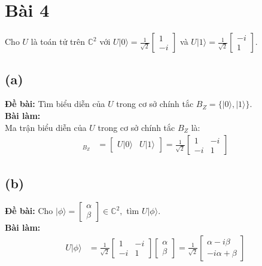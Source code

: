 \section{Bài 4}
Cho $U$ là toán tử trên $\mathbb{C}^{2}$ với $U|0\rangle=\frac{1}{\sqrt{2}}\begin{bmatrix}1\\ -i\end{bmatrix}$ và $U|1\rangle=\frac{1}{\sqrt{2}}\begin{bmatrix}-i\\ 1\end{bmatrix}$.

\subsection{(a)}
\textbf{Đề bài:} Tìm biểu diễn của $U$ trong cơ sở chính tắc $B_{Z}=\{|0\rangle,|1\rangle\}$.\\
\textbf{Bài làm:}\\
Ma trận biểu diễn của $U$ trong cơ sở chính tắc $B_{Z}$ là:
\begin{align*}
    [U]_{B_{Z}} & = \begin{bmatrix}
                        U|0\rangle & U|1\rangle
                    \end{bmatrix} = \frac{1}{\sqrt{2}}\begin{bmatrix}
                                                          1  & -i \\
                                                          -i & 1
                                                      \end{bmatrix}
\end{align*}

\subsection{(b)}
\textbf{Đề bài:} Cho $|\phi\rangle=\begin{bmatrix}\alpha\\ \beta\end{bmatrix}\in\mathbb{C}^{2},$ tìm $U|\phi\rangle$.\\
\textbf{Bài làm:}
\begin{align*}
    U|\phi\rangle & = \frac{1}{\sqrt{2}}\begin{bmatrix}
                                            1  & -i \\
                                            -i & 1
                                        \end{bmatrix}
    \begin{bmatrix}
        \alpha \\\beta
    \end{bmatrix}
    = \frac{1}{\sqrt{2}}\begin{bmatrix}
                            \alpha - i\beta \\
                            -i\alpha + \beta
                        \end{bmatrix}
\end{align*}

